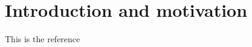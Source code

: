 \section{Introduction and motivation}
\label{sec:Introduction}

This is the reference~\cite{Gligorov:2017nwh}

